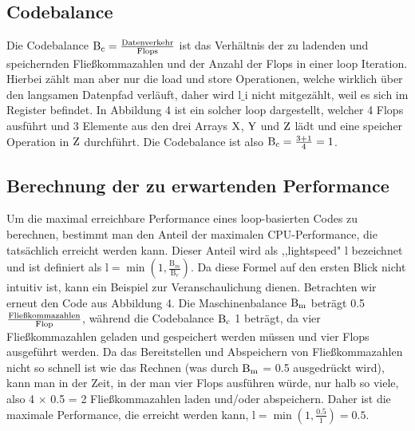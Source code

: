 \documentclass{article}
\begin{document}
    \subsection{Codebalance}
    Die Codebalance $\textnormal{B}_{\textnormal{c}} = \frac{\textnormal{Datenverkehr}}{\textnormal{Flops}}$ ist das Verhältnis
    der zu ladenden und speichernden Fließkommazahlen und der Anzahl der Flops in einer loop Iteration. 
    Hierbei zählt man aber nur die load und store Operationen, welche wirklich über den langsamen Datenpfad verläuft, daher wird $\text{l\_i}$ nicht mitgezählt,
    weil es sich im Register befindet.
    In Abbildung 4 ist ein solcher loop dargestellt, %
    welcher 4 Flops ausführt und 3 Elemente aus den drei Arrays $\textnormal{X}$, $\textnormal{Y}$ und $\textnormal{Z}$ lädt 
    und eine speicher Operation in $\textnormal{Z}$ durchführt. Die Codebalance ist also $\textnormal{B}_{\textnormal{c}} = \frac{3+1}{4} = 1$. 


    \subsection{Berechnung der zu erwartenden Performance}
    Um die maximal erreichbare Performance eines loop-basierten Codes zu berechnen, 
    bestimmt man den Anteil der maximalen CPU-Performance, die tatsächlich erreicht werden kann. 
    Dieser Anteil wird als ,,lightspeed" $\text{l}$ bezeichnet und ist definiert als 
    $\text{l} = \min(1, \frac{\text{B}_{m}}{\text{B}_{c}})$. 
    Da diese Formel auf den ersten Blick nicht intuitiv ist, 
    kann ein Beispiel zur Veranschaulichung dienen. 
    Betrachten wir erneut den Code aus Abbildung 4. 
    Die Maschinenbalance $\textnormal{B}_{\textnormal{m}}$ 
    beträgt 0.5 $\frac{\textnormal{Fließkommazahlen}}{\textnormal{Flop}}$, 
    während die Codebalance $\textnormal{B}_{\textnormal{c}}$ 1 beträgt, 
    da vier Fließkommazahlen geladen und gespeichert werden müssen und vier Flops ausgeführt werden. 
    Da das Bereitstellen und Abspeichern von Fließkommazahlen nicht so schnell ist wie das Rechnen 
    (was durch $\textnormal{B}_{\textnormal{m}}$  = 0.5 ausgedrückt wird), kann man in der Zeit, 
    in der man vier Flops ausführen würde, 
    nur halb so viele, also 4 $\times$ 0.5 = 2 Fließkommazahlen laden und/oder abspeichern.
    Daher ist die maximale Performance, die erreicht werden kann, 
    $\text{l} = \min(1, \frac{0.5}{1}) = 0.5$. 
    
\end{document}
